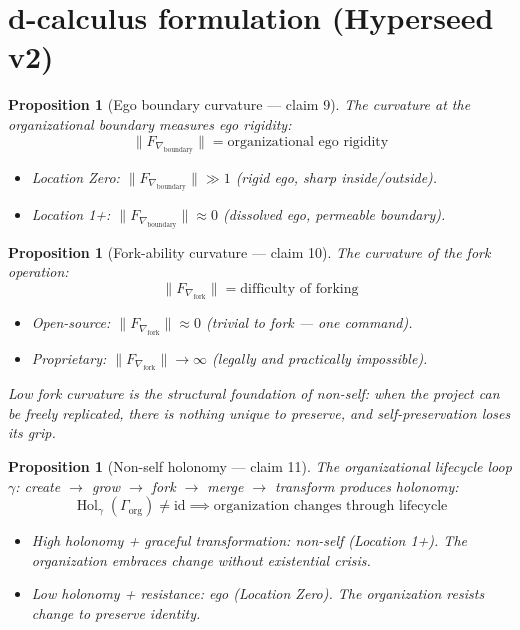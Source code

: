 \documentclass[11pt,a4paper]{article}
\newtheorem{proposition}[definition]{Proposition}
\begin{document}
\section{d-calculus formulation (Hyperseed v2)}

\begin{proposition}[Ego boundary curvature --- claim 9]
\label{prop:ego}
The curvature at the organizational boundary measures ego rigidity:
\[
  \|F_{\nabla_{\text{boundary}}}\| = \text{organizational ego rigidity}
\]
\begin{itemize}
  \item Location Zero: $\|F_{\nabla_{\text{boundary}}}\| \gg 1$
    (rigid ego, sharp inside/outside).
  \item Location 1+: $\|F_{\nabla_{\text{boundary}}}\| \approx 0$
    (dissolved ego, permeable boundary).
\end{itemize}
\end{proposition}

\begin{proposition}[Fork-ability curvature --- claim 10]
\label{prop:fork}
The curvature of the fork operation:
\[
  \|F_{\nabla_{\text{fork}}}\| = \text{difficulty of forking}
\]
\begin{itemize}
  \item Open-source: $\|F_{\nabla_{\text{fork}}}\| \approx 0$
    (trivial to fork --- one command).
  \item Proprietary: $\|F_{\nabla_{\text{fork}}}\| \to \infty$
    (legally and practically impossible).
\end{itemize}
Low fork curvature is the structural foundation of non-self: when
the project can be freely replicated, there is nothing unique to
preserve, and self-preservation loses its grip.
\end{proposition}

\begin{proposition}[Non-self holonomy --- claim 11]
\label{prop:holonomy}
The organizational lifecycle loop $\gamma$: create $\to$ grow $\to$
fork $\to$ merge $\to$ transform produces holonomy:
\[
  \operatorname{Hol}_\gamma(\Gamma_{\text{org}}) \neq \mathrm{id}
  \implies \text{organization changes through lifecycle}
\]
\begin{itemize}
  \item High holonomy + graceful transformation: non-self (Location 1+).
    The organization embraces change without existential crisis.
  \item Low holonomy + resistance: ego (Location Zero). The organization
    resists change to preserve identity.
\end{itemize}
\end{proposition}
\end{document}

